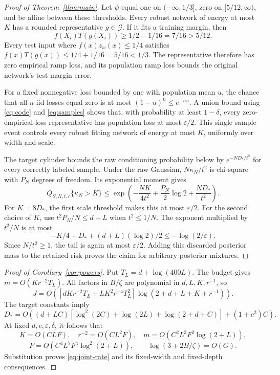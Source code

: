 \documentclass[11pt]{article}
\begin{document}
\begin{proof}[Proof of Theorem~\ref{thm:main}]
Let $\psi$ equal one on $(-\infty,1/3]$, zero on $[5/12,\infty)$,
and be affine between these thresholds. Every robust network of energy
at most $K$ has a rounded representative $g\in\mathcal G$.
If it fits a training margin, then
\[
 f(X_i)T(g(X_i))\ge1/2-1/16=7/16>5/12.
\]
Every test input where $f(x)z_w(x)\le1/4$ satisfies
$f(x)T(g(x))\le1/4+1/16=5/16<1/3$.
The representative therefore has zero empirical ramp loss, and its
population ramp loss bounds the original network's test-margin error.

For a fixed nonnegative loss bounded by one with population mean $u$,
the chance that all $n$ iid losses equal zero is at most
$(1-u)^n\le e^{-nu}$. A union bound using \eqref{eq:code} and
\eqref{eq:samples} shows that, with probability at least $1-\delta$,
every zero-empirical-loss representative has population loss at most
$\varepsilon/2$. This single sample event controls every robust fitting
network of energy at most $K$, uniformly over width and scale.

The target cylinder bounds the raw conditioning probability below by
$e^{-ND_*/t^2}$ for every correctly labeled sample.
Under the raw Gaussian, $N\kappa_N/t^2$ is chi-square with $P_N$
degrees of freedom. Its exponential moment gives
\begin{equation}\label{eq:tail}
 Q_{S,N,t,c}\{\kappa_N>K\}
 \le\exp\!\left(-\frac{NK}{4t^2}
                  +\frac{P_N}{2}\log2+\frac{ND_*}{t^2}\right).
\end{equation}
For $K=8D_*$, the first scale threshold makes this at most
$\varepsilon/2$. For the second choice of $K$, use
$t^2P_N/N\le d+L$ when $t^2\le1/N$. The exponent multiplied by
$t^2/N$ is at most
\[
 -K/4+D_*+(d+L)(\log2)/2\le-\log(2/\varepsilon).
\]
Since $N/t^2\ge1$, the tail is again at most $\varepsilon/2$.
Adding this discarded posterior mass to the retained risk proves the
claim for arbitrary posterior mixtures.
\end{proof}

\begin{proof}[Proof of Corollary~\ref{cor:powers}]
Put $T_L=d+\log(400L)$. The budget gives
$m=O(Kr^{-2}T_L)$. All factors in $B/\zeta$ are polynomial in
$d,L,K,r^{-1}$, so
\[
 J=O\!\left(
 [dKr^{-2}T_L+LK^2r^{-4}T_L^2]
 \log(2+d+L+K+r^{-1})\right).
\]
The target constants imply
\[
 D_*=O\!\left((d+LC)
 [\log^2(2C)+\log(2L)+\log(2+d+C)]+(1+c^2)C\right).
\]
At fixed $d,c,\varepsilon,\delta$, it follows that
\[
 K=O(CLF),\quad r^{-2}=O(CL^2F),\quad
 m=O(C^2L^3F^2\log(2+L)),
\]
\[
 P=O(C^4L^7F^4\log^2(2+L)),\qquad
 \log(3+2B/\zeta)=O(G).
\]
Substitution proves \eqref{eq:joint-rate} and its fixed-width and
fixed-depth consequences.
\end{proof}
\end{document}
